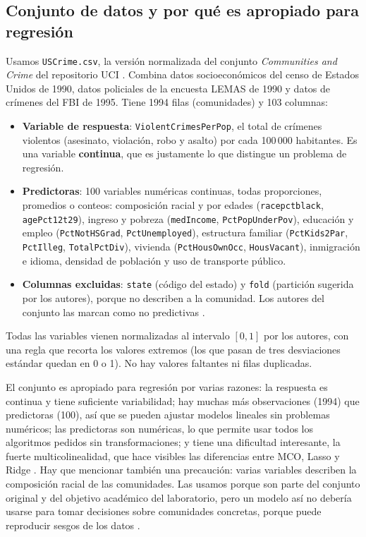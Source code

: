 \documentclass[11pt,a4paper]{article}
\let\citepOriginal\citep
\renewcommand*{\citep}[1]{\textbf{\citepOriginal{#1}}}%
\begin{document}
\subsection{Conjunto de datos y por qué es apropiado para regresión}
Usamos \texttt{USCrime.csv}, la versión normalizada del conjunto \textit{Communities and Crime} del repositorio UCI \citep{redmond2002,redmond2009}. Combina datos socioeconómicos del censo de Estados Unidos de 1990, datos policiales de la encuesta LEMAS de 1990 y datos de crímenes del FBI de 1995. Tiene 1994 filas (comunidades) y 103 columnas:
\begin{itemize}
  \item \textbf{Variable de respuesta}: \texttt{ViolentCrimesPerPop}, el total de crímenes violentos (asesinato, violación, robo y asalto) por cada 100\,000 habitantes. Es una variable \textbf{continua}, que es justamente lo que distingue un problema de regresión.
  \item \textbf{Predictoras}: 100 variables numéricas continuas, todas proporciones, promedios o conteos: composición racial y por edades (\texttt{racepctblack}, \texttt{agePct12t29}), ingreso y pobreza (\texttt{medIncome}, \texttt{PctPopUnderPov}), educación y empleo (\texttt{PctNotHSGrad}, \texttt{PctUnemployed}), estructura familiar (\texttt{PctKids2Par}, \texttt{PctIlleg}, \texttt{TotalPctDiv}), vivienda (\texttt{PctHousOwnOcc}, \texttt{HousVacant}), inmigración e idioma, densidad de población y uso de transporte público.
  \item \textbf{Columnas excluidas}: \texttt{state} (código del estado) y \texttt{fold} (partición sugerida por los autores), porque no describen a la comunidad. Los autores del conjunto las marcan como no predictivas \citep{redmond2009}.
\end{itemize}
Todas las variables vienen normalizadas al intervalo $[0,1]$ por los autores, con una regla que recorta los valores extremos (los que pasan de tres desviaciones estándar quedan en 0 o 1). No hay valores faltantes ni filas duplicadas.

El conjunto es apropiado para regresión por varias razones: la respuesta es continua y tiene suficiente variabilidad; hay muchas más observaciones (1994) que predictoras (100), así que se pueden ajustar modelos lineales sin problemas numéricos; las predictoras son numéricas, lo que permite usar todos los algoritmos pedidos sin transformaciones; y tiene una dificultad interesante, la fuerte multicolinealidad, que hace visibles las diferencias entre MCO, Lasso y Ridge \citep{dormann2013}. Hay que mencionar también una precaución: varias variables describen la composición racial de las comunidades. Las usamos porque son parte del conjunto original y del objetivo académico del laboratorio, pero un modelo así no debería usarse para tomar decisiones sobre comunidades concretas, porque puede reproducir sesgos de los datos \citep{kearns2018}.
\end{document}
